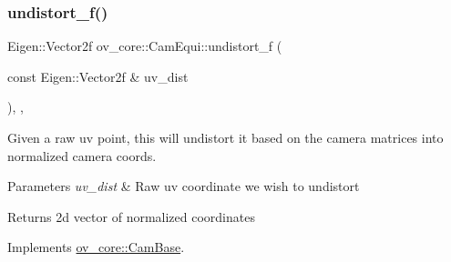\mbox{\label{classov__core_1_1CamEqui_a737d6b4b634ae1da976d362158323059}} 
\subsubsection{\texorpdfstring{undistort\+\_\+f()}{undistort\_f()}}
{\footnotesize\ttfamily Eigen\+::\+Vector2f ov\+\_\+core\+::\+Cam\+Equi\+::undistort\+\_\+f (\begin{DoxyParamCaption}\item[{const Eigen\+::\+Vector2f \&}]{uv\+\_\+dist }\end{DoxyParamCaption})\hspace{0.3cm}{\ttfamily [inline]}, {\ttfamily [override]}, {\ttfamily [virtual]}}



Given a raw uv point, this will undistort it based on the camera matrices into normalized camera coords. 


\begin{DoxyParams}{Parameters}
{\em uv\+\_\+dist} & Raw uv coordinate we wish to undistort \\
\hline
\end{DoxyParams}
\begin{DoxyReturn}{Returns}
2d vector of normalized coordinates 
\end{DoxyReturn}


Implements \hyperlink{classov__core_1_1CamBase_ad0db03f97e5a12f5ad757f72e60f50e4}{ov\+\_\+core\+::\+Cam\+Base}.

